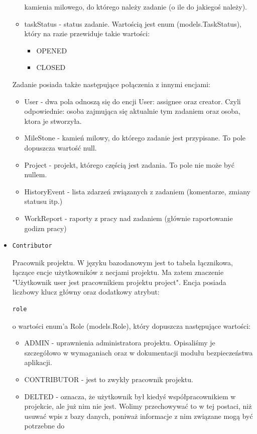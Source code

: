 \documentclass[a4paper,12pt,notitlepage]{mwrep}
\begin{document}
\begin{itemize}
\begin{itemize}
				kamienia milowego, do którego należy zadanie (o ile do jakiegoś należy).
			\item	taskStatus - status zadanie. Wartością jest enum (models.TaskStatus), który na razie przewiduje takie wartości:
			\begin{itemize}
				\item	OPENED
				\item	CLOSED
			\end{itemize}
		\end{itemize}	
 		Zadanie posiada także następujące połączenia z innymi encjami:
		\begin{itemize}
			\item	User - dwa pola odnoszą się do encji User: assignee oraz creator. Czyli odpowiednie: osoba zajmująca się aktualnie 
				tym zadaniem oraz osoba, ktora je stworzyła.
			\item	MileStone - kamień milowy, do którego zadanie jest przypisane. To pole dopuszcza wartość null.
			\item	Project - projekt, którego częścią jest zadania. To pole nie może być nullem.
			\item	HistoryEvent - lista zdarzeń związanych z zadaniem (komentarze, zmiany statusu itp.)
			\item	WorkReport - raporty z pracy nad zadaniem (głównie raportowanie godizn pracy)
		\end{itemize}
	\item	\begin{verbatim}Contributor\end{verbatim} Pracownik projektu. W języku bazodanowym jest to tabela łącznikowa, łączące encje użytkowników 
		z necjami projektu. Ma zatem znaczenie "Użytkownik user jest pracownikiem projektu project". Encja posiada liczbowy klucz główny oraz 
		dodatkowy atrybut: \begin{verbatim}role\end{verbatim} o wartości enum'a Role (models.Role), który dopuszcza następujące wartości:
		\begin{itemize}
			\item	ADMIN - uprawnienia administratora projektu. Opisaliśmy je szczegółowo w wymaganiach oraz w dokumentacji modułu 
				bezpieczeństwa aplikacji.
			\item	CONTRIBUTOR - jest to zwykły pracownik projektu.
			\item	DELTED - oznacza, że użytkownik był kiedyś współpracownikiem w projekcie, ale już nim nie jest. Wolimy przechowywać 
				to w tej postaci, niż usuwać wpis z bazy danych, poniważ informacje z nim związane mogą być potrzebne do 

\end{itemize}
\end{itemize}
\end{document}
